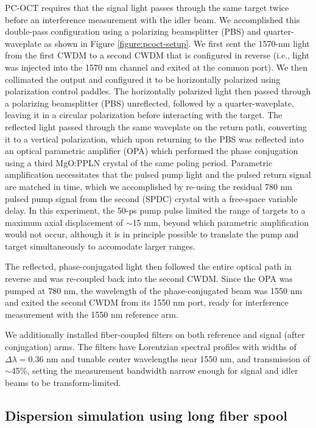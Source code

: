 PC-OCT requires that the signal light passes through the same target twice before an interference measurement with the idler beam. We accomplished this double-pass configuration using a polarizing beamsplitter (PBS) and quarter-waveplate as shown in Figure \ref{figure:pcoct-setup}. We first sent the 1570-nm light from the first CWDM to a second CWDM that is configured in reverse (i.e., light was injected into the 1570 nm channel and exited at the common port). We then collimated the output and configured it to be horizontally polarized using polarization control paddles. The horizontally polarized light then passed through a polarizing beamsplitter (PBS) unreflected, followed by a quarter-waveplate, leaving it in a circular polarization before interacting with the target. The reflected light passed through the same waveplate on the return path, converting it to a vertical polarization, which upon returning to the PBS was reflected into an optical parametric amplifier (OPA) which performed the phase conjugation using a third MgO:PPLN crystal of the same poling period. Parametric amplification necessitates that the pulsed pump light and the pulsed return signal are matched in time, which we accomplished by re-using the residual 780 nm pulsed pump signal from the second (SPDC) crystal with a free-space variable delay. In this experiment, the 50-ps pump pulse limited the range of targets to a maximum axial displacement of $\sim$15 mm, beyond which parametric amplification would not occur, although it is in principle possible to translate the pump and target simultaneously to accomodate larger ranges.

The reflected, phase-conjugated light then followed the entire optical path in reverse and was re-coupled back into the second CWDM. Since the OPA was pumped at 780 nm, the wavelength of the phase-conjugated beam was 1550 nm and exited the second CWDM from its 1550 nm port, ready for interference measurement with the 1550 nm reference arm.

We additionally installed fiber-coupled filters on both reference and signal (after conjugation) arms. The filters have Lorentzian spectral profiles with widths of $\Delta\lambda = 0.36$ nm and tunable center wavelengths near 1550 nm, and transmission of $\sim$45\%, setting the measurement bandwidth narrow enough for signal and idler beams to be transform-limited.

\subsection{Dispersion simulation using long fiber spool}

